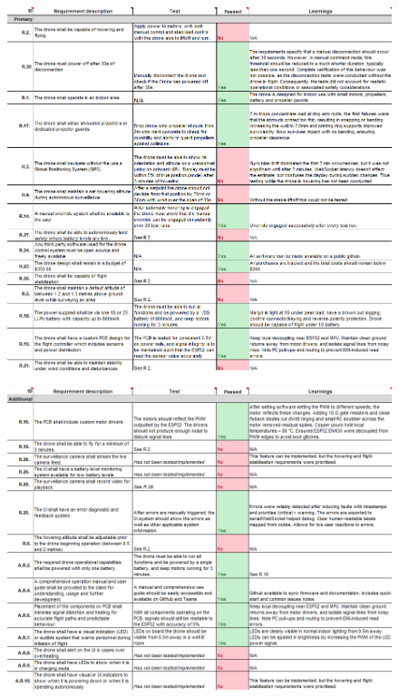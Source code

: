 \begin{figure}[H]
    \centering
    \includegraphics[width=\textwidth]{img/vandv1.png}
\end{figure}

\begin{figure}[H]
    \centering
    \includegraphics[width=\textwidth]{img/vandv2.png}
\end{figure}

\pagebreak
